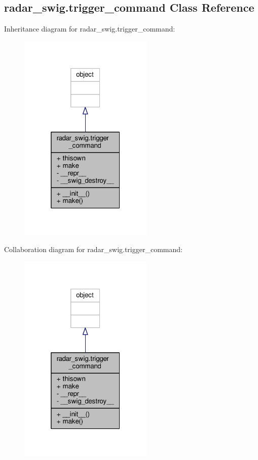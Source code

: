 \subsection{radar\+\_\+swig.\+trigger\+\_\+command Class Reference}
\label{classradar__swig_1_1trigger__command}


Inheritance diagram for radar\+\_\+swig.\+trigger\+\_\+command\+:
\nopagebreak
\begin{figure}[H]
\begin{center}
\leavevmode
\includegraphics[width=181pt]{d3/d50/classradar__swig_1_1trigger__command__inherit__graph}
\end{center}
\end{figure}


Collaboration diagram for radar\+\_\+swig.\+trigger\+\_\+command\+:
\nopagebreak
\begin{figure}[H]
\begin{center}
\leavevmode
\includegraphics[width=181pt]{db/dcb/classradar__swig_1_1trigger__command__coll__graph}
\end{center}
\end{figure}
